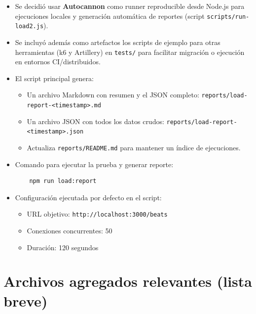 \documentclass[12pt, a4paper]{article}
\begin{document}
\begin{itemize}
  \item Se decidió usar \textbf{Autocannon} como runner reproducible desde Node.js para ejecuciones locales y generación automática de reportes (script \texttt{scripts/run-load2.js}).
  \item Se incluyó además como artefactos los scripts de ejemplo para otras herramientas (k6 y Artillery) en \texttt{tests/} para facilitar migración o ejecución en entornos CI/distribuidos.
  \item El script principal genera:
    \begin{itemize}
      \item Un archivo Markdown con resumen y el JSON completo: \texttt{reports/load-report-<timestamp>.md}
      \item Un archivo JSON con todos los datos crudos: \texttt{reports/load-report-<timestamp>.json}
      \item Actualiza \texttt{reports/README.md} para mantener un índice de ejecuciones.
    \end{itemize}
  \item Comando para ejecutar la prueba y generar reporte:
    \begin{verbatim}
    npm run load:report
    \end{verbatim}
  \item Configuración ejecutada por defecto en el script:
    \begin{itemize}
      \item URL objetivo: \texttt{http://localhost:3000/beats}
      \item Conexiones concurrentes: 50
      \item Duración: 120 segundos
    \end{itemize}
\end{itemize}

\section{Archivos agregados relevantes (lista breve)}
\end{document}

